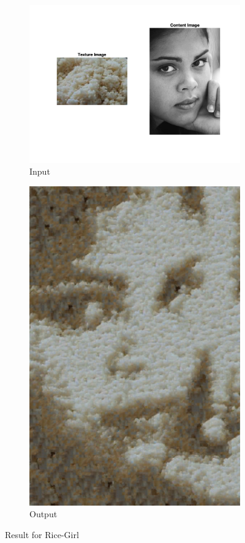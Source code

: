 \documentclass[10pt,twocolumn,letterpaper]{article}
\begin{document}
\begin{figure}[h]
    \centering
    \begin{subfigure}[h]{0.45\textwidth}
        \centering
        \includegraphics[trim={2cm 4cm 2cm 1cm}, clip, scale=0.5]{../results/bsize/inp_rice_girl.png}
        \caption{Input}
    \end{subfigure}
    \hfill
    \begin{subfigure}[h]{0.5\textwidth}
       \centering
       \includegraphics[scale=0.4]{../results/bsize/out_rice_girl_B_20_bdr_0_700000.png}
       \caption{Output}
   \end{subfigure}
   \caption{Result for Rice-Girl}
   \label{fig:ap_bs}
\end{figure}
\end{document}
